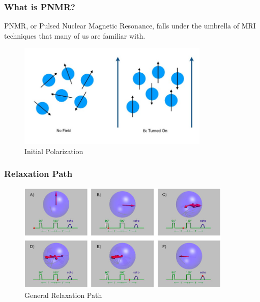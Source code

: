 \begin{frame}[fragile]
  \frametitle{What is PNMR?}
  PNMR, or Pulsed Nuclear Magnetic Resonance, falls under the umbrella of MRI techniques that many of us are familiar with. 
  \begin{figure}
  \begin{center}
        \includegraphics[height=5cm]{./images/polarization.jpeg}
\end{center}
\caption{Initial Polarization \cite{init_polar}}
\label{fig:relax}
\end{figure}
\end{frame}

\begin{frame}
  \frametitle{Relaxation Path}
  \begin{figure}[htbp!]
    \begin{center}
      \includegraphics[height=5.2cm]{./images/figures/theory/relax.png}
    \end{center}
          \caption{General Relaxation Path \cite{spin_echo}}
    \label{fig:relax}
  \end{figure}
\end{frame}


